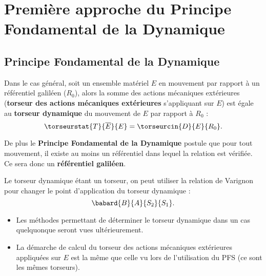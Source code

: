 \section[Première approche du PFD]{Première approche du Principe Fondamental de la Dynamique}

\subsection{Principe Fondamental de la Dynamique}



\begin{defi}
Dans le cas général, soit un ensemble matériel $E$ en mouvement par rapport à un référentiel galiléen ($R_0$), alors la somme des actions mécaniques extérieures (\textbf{torseur des actions mécaniques extérieures} s'appliquant sur $E$) est égale au \textbf{torseur dynamique} du mouvement de $E$ par rapport à $R_0$ :
$$
\torseurstat{T}{\overline{E}}{E}=\torseurcin{D}{E}{R_0}.
$$

De plus le \textbf{Principe Fondamental de la Dynamique} postule que pour tout mouvement, il existe au moins un référentiel dans lequel la relation est vérifiée. Ce sera donc un \textbf{référentiel galiléen}.
\end{defi}


\begin{resultat}
Le torseur dynamique étant un torseur, on peut utiliser la relation de Varignon pour changer le point d'application du torseur dynamique :
$$
\babard{B}{A}{S_2}{S_1}.
$$


\end{resultat}

\begin{remarque}[s]
\begin{itemize}
\item Les méthodes permettant de déterminer le torseur dynamique dans un cas quelquonque seront vues ultérieurement.
\item La démarche de calcul du torseur des actions mécaniques extérieures appliquées sur $E$ est la même que celle vu lors de l'utilisation du PFS (ce sont les mêmes torseurs). 
\end{itemize}
\end{remarque}

